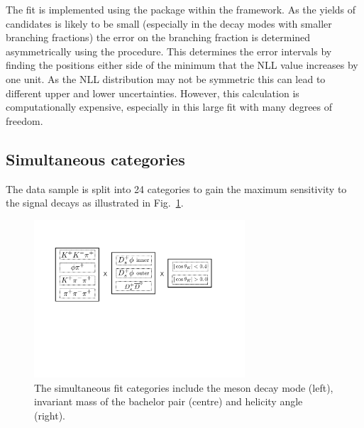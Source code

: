 The fit is implemented using the \roofit package within the \root framework. 
As the yields of candidates is likely to be small (especially in the \Dsp decay modes with smaller branching fractions) the error on the branching fraction is determined asymmetrically using the \minos procedure. This determines the error intervals by finding the positions either side of the minimum that the NLL value increases by one unit. As the NLL distribution may not be symmetric this can lead to different upper and lower uncertainties. However, this calculation is computationally expensive, especially in this large fit with many degrees of freedom.  


\subsection{Simultaneous categories}
\label{sec:B2DsPhi_fit_cats}

The data sample is split into 24 categories to gain the maximum sensitivity to the signal decays as illustrated in Fig.~\ref{fig:B2DsPhi_simfit}.

\begin{figure}[!h]
    \centering
    \includegraphics[width=0.7\textwidth]{figs/B2DsPhi/simfit_cats.pdf}
    \caption{The simultaneous fit categories include the \Dsp meson decay mode (left), invariant mass of the bachelor \Kp\Km pair (centre) and helicity angle (right).}
    \label{fig:B2DsPhi_simfit}   
\end{figure}


